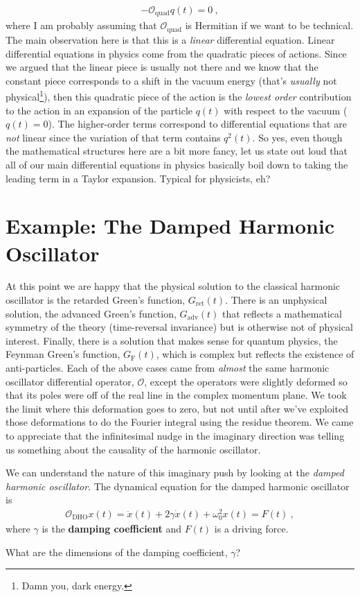 \begin{align}
  -\mathcal O_\text{quad} q(t) = 0 \ ,
\end{align}
where I am probably assuming that $\mathcal O_\text{quad}$ is Hermitian if we want to be technical. The main observation here is that this is a \emph{linear} differential equation. Linear differential equations in physics come from the quadratic pieces of actions. Since we argued that the linear piece is usually not there and we know that the constant piece corresponds to a shift in the vacuum energy (that's \emph{usually} not physical\footnote{Damn you, dark energy.}), then this quadratic piece of the action is the \emph{lowest order} contribution to the action in an expansion of the particle $q(t)$ with respect to the vacuum ($q(t)=0$). The higher-order terms correspond to differential equations that are \emph{not} linear since the variation of that term contains $q^2(t)$. So yes, even though the mathematical structures here are a bit more fancy, let us state out loud that all of our main differential equations in physics basically boil down to taking the leading term in a Taylor expansion. Typical for physicists, eh?

\section{Example: The Damped Harmonic Oscillator}
 
 At this point we are happy that the physical solution to the classical harmonic oscillator is the retarded Green's function, $G_\text{ret}(t)$. There is an unphysical solution, the advanced Green's function, $G_\text{adv}(t)$ that reflects a mathematical symmetry of the theory (time-reversal invariance) but is otherwise not of physical interest. Finally, there is a solution that makes sense for quantum physics, the Feynman Green's function, $G_\text{F}(t)$, which is complex but reflects the existence of anti-particles. Each of the above cases came from \emph{almost} the same harmonic oscillator differential operator, $\mathcal O$, except the operators were slightly deformed so that its poles were off of the real line in the complex momentum plane. We took the limit where this deformation goes to zero, but not until after we've exploited those deformations to do the Fourier integral using the residue theorem. We came to appreciate that the infinitesimal nudge in the imaginary direction was telling us something about the causality of the harmonic oscillator.

 We can understand the nature of this imaginary push by looking at the \emph{damped harmonic oscillator}. The dynamical equation for the damped harmonic oscillator is
 \begin{align}
  \mathcal O_\text{DHO} x(t) = \ddot{x}(t) + 2\gamma\dot x(t) + \omega_0^2 x(t) = F(t) \ ,
 \end{align}
 where $\gamma$ is the \textbf{damping coefficient} and $F(t)$ is a driving force.
 \begin{exercise}
 What are the dimensions of the damping coefficient, $\gamma$?
 \end{exercise}
 
